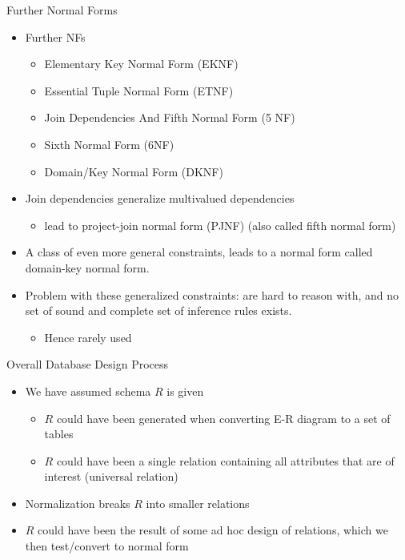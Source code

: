 \documentclass[aspectratio=169, xcolor=dvipsnames]{beamer}
\begin{document}
\begin{frame}{Further Normal Forms}
    \begin{itemize}[<+->]
        \item Further NFs
        \begin{itemize}
            \item[$\triangleright$] Elementary Key Normal Form (EKNF)
            \item[$\triangleright$] Essential Tuple Normal Form (ETNF)
            \item[$\triangleright$] Join Dependencies And Fifth Normal Form (5 NF)
            \item[$\triangleright$] Sixth Normal Form (6NF)
            \item[$\triangleright$] Domain/Key Normal Form (DKNF)
        \end{itemize}
        \item Join dependencies generalize multivalued dependencies
        \begin{itemize}
            \item[$\triangleright$] lead to project-join normal form (PJNF) (also called fifth normal form)
        \end{itemize}
        \item A class of even more general constraints, leads to a normal form called domain-key normal form.
        \item Problem with these generalized constraints: are hard to reason with, and no set of sound and complete set of inference rules exists.
        \begin{itemize}
            \item[$\triangleright$] Hence rarely used
        \end{itemize}
    \end{itemize}
\end{frame}

\begin{frame}{Overall Database Design Process}
    \begin{itemize}[<+->]
        \item We have assumed schema $R$ is given
        \begin{itemize}
            \item[$\triangleright$] $R$ could have been generated when converting E-R diagram to a set of tables
            \item[$\triangleright$] $R$ could have been a single relation containing all attributes that are of interest (universal relation)
        \end{itemize}
        \item Normalization breaks $R$ into smaller relations
        \item $R$ could have been the result of some ad hoc design of relations, which we then test/convert to normal form
    \end{itemize}
\end{frame}
\end{document}
